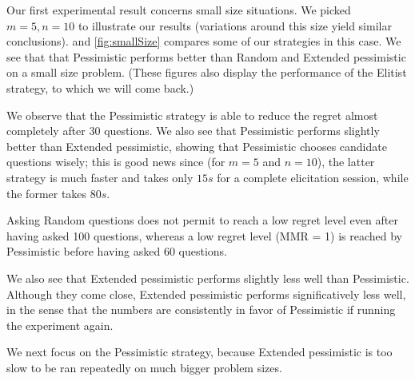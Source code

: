 \documentclass[sigconf, anonymous]{aamas}
\begin{document}
Our first experimental result concerns small size situations. We picked $m = 5, n = 10$ to illustrate our results (variations around this size yield similar conclusions). 
 and \cref{fig:smallSize} compares some of our strategies in this case.
We see that that Pessimistic performs better than Random and Extended pessimistic on a small size problem.
(These figures also display the performance of the Elitist strategy, to which we will come back.)

We observe that the Pessimistic strategy is able to reduce the regret almost completely after $30$ questions. We also see that Pessimistic performs slightly better than Extended pessimistic, showing that Pessimistic chooses candidate questions wisely; this is good news since (for $m = 5$ and $n = 10$), the latter strategy is much faster and takes only $15s$ for a complete elicitation session, while the former takes $80s$.

Asking Random questions does not permit to reach a low regret level even after having asked 100 questions, whereas a low regret level (MMR = 1) is reached by Pessimistic before having asked 60 questions.

We also see that Extended pessimistic performs slightly less well than Pessimistic. Although they come close, Extended pessimistic performs significatively less well, in the sense that the numbers are consistently in favor of Pessimistic if running the experiment again.

We next focus on the Pessimistic strategy, because Extended pessimistic is too slow to be ran repeatedly on much bigger problem sizes.
\end{document}
